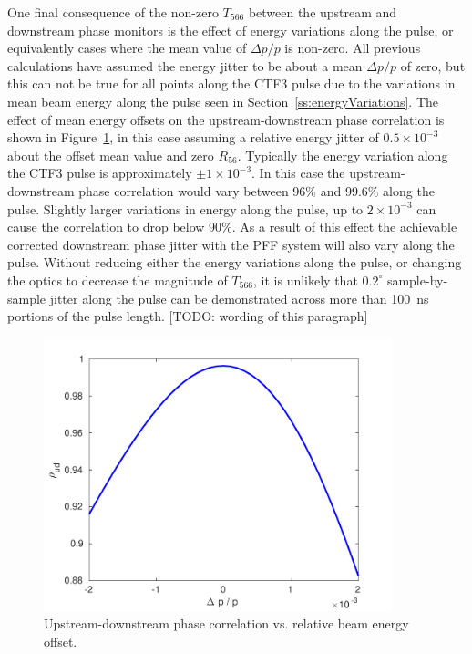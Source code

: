 One final consequence of the non-zero \(T_{566}\) between the upstream and downstream phase monitors is the effect of energy variations along the pulse, or equivalently cases where the mean value of \(\Delta p/p\) is non-zero. All previous calculations have assumed the energy jitter to be about a mean \(\Delta p / p\) of zero, but this can not be true for all points along the CTF3 pulse due to the variations in mean beam energy along the pulse seen in Section~\ref{ss:energyVariations}. The effect of mean energy offsets on the upstream-downstream phase correlation is shown in Figure~\ref{f:corrVsEnergyOffset}, in this case assuming a relative energy jitter of \(0.5\times10^{-3}\) about the offset mean value and zero \(R_{56}\). Typically the energy variation along the CTF3 pulse is approximately \(\pm1 \times10^{-3}\). In this case the upstream-downstream phase correlation would vary between 96\% and 99.6\% along the pulse. Slightly larger variations in energy along the pulse, up to \(2\times 10^{-3}\) can cause the correlation to drop below 90\%. As a result of this effect the achievable corrected downstream phase jitter with the PFF system will also vary along the pulse. Without reducing either the energy variations along the pulse, or changing the optics to decrease the magnitude of \(T_{566}\), it is unlikely that \(0.2^\circ\) sample-by-sample jitter along the pulse can be demonstrated across more than 100~ns portions of the pulse length. [TODO: wording of this paragraph]

\begin{figure}
  \centering
  \includegraphics[width=0.9\textwidth]{Figures/propagation/corrVsEnergyOffset}
  \caption{Upstream-downstream phase correlation vs. relative beam energy offset.}
  \label{f:corrVsEnergyOffset}
\end{figure}

